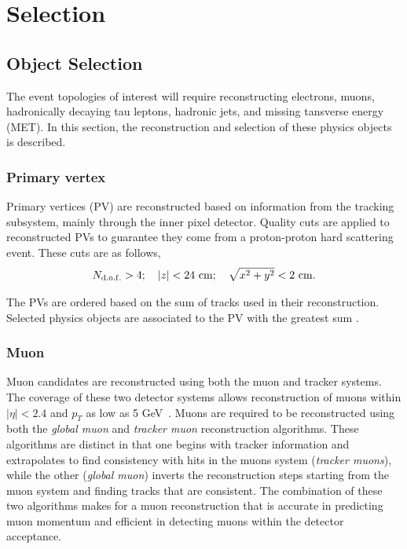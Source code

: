 \section{Selection}
\label{sec:analysis:selection}



\subsection{Object Selection}
The event topologies of interest will require reconstructing electrons, muons, hadronically decaying tau leptons, hadronic jets, and missing tansverse energy (MET).  In this section, the reconstruction and selection of these physics objects is described.



\subsubsection{Primary vertex}
Primary vertices (PV) are reconstructed based on information from the tracking subsystem, mainly through the inner pixel detector. Quality cuts are applied to reconstructed PVs to guarantee they come from a proton-proton hard scattering event. These cuts are as follows,
\begin{equation*}
    N_{\rm d.o.f.}> 4; \quad  \left|z\right| < 24~\mathrm{cm}; \quad \sqrt{x^{2} + y^{2}} < 2~\mathrm{cm}.
\end{equation*}


The PVs are ordered based on the sum \pt of tracks used in their reconstruction. Selected physics objects are associated to the PV with the greatest sum \pt. 




\subsubsection{Muon}
Muon candidates are reconstructed using both the muon and tracker systems. The coverage of these two detector systems allows reconstruction of muons within $\left|\eta\right| < 2.4$ and $p_{T}$ as low as 5 GeV~\cite{Chatrchyan:2012xi}. Muons are required to be reconstructed using both the \emph{global muon} and \emph{tracker muon} reconstruction algorithms. These algorithms are distinct in that one begins with tracker information and extrapolates to find consistency with hits in the muons system (\emph{tracker muons}), while the other (\emph{global muon}) inverts the reconstruction steps starting from the muon system and finding tracks that are consistent. The combination of these two algorithms makes for a muon reconstruction that is accurate in predicting muon momentum and efficient in detecting muons within the detector acceptance.

